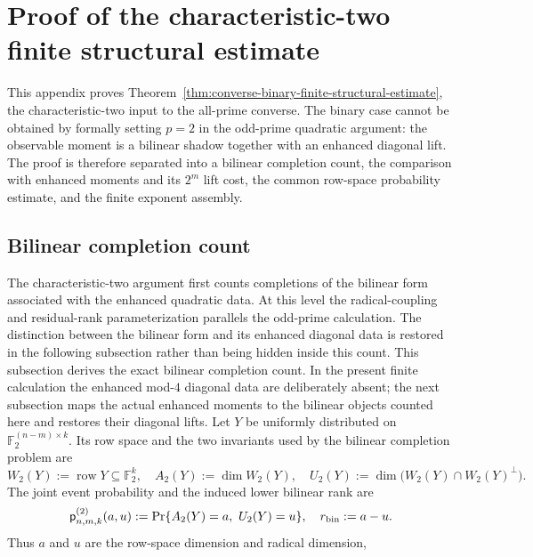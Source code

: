\documentclass[11pt]{article}
\newcommand{\F}{\mathbb F}
\newcommand{\1}{\mathbf 1}
\theoremstyle{plain}
\theoremstyle{definition}
\theoremstyle{remark}
\begin{document}
\section{Proof of the characteristic-two finite structural estimate}
\label{app:binary-finite-structural-proof}
This appendix proves Theorem~\ref{thm:converse-binary-finite-structural-estimate}, the characteristic-two input to the all-prime converse.  The binary case cannot be obtained by formally setting $p=2$ in the odd-prime quadratic argument: the observable moment is a bilinear shadow together with an enhanced diagonal lift.  The proof is therefore separated into a bilinear completion count, the comparison with enhanced moments and its $2^m$ lift cost, the common row-space probability estimate, and the finite exponent assembly.

\subsection{Bilinear completion count}
The characteristic-two argument first counts completions of the bilinear form associated with the enhanced quadratic data.  At this level the radical-coupling and residual-rank parameterization parallels the odd-prime calculation.  The distinction between the bilinear form and its enhanced diagonal data is restored in the following subsection rather than being hidden inside this count.
\label{subsubsec:binary-complete-finite-proof}
\label{sec:integrated-qubit-completion}
This subsection derives the exact bilinear completion count.  In the present finite calculation
the enhanced mod-$4$ diagonal data are deliberately absent; the next
subsection maps the actual enhanced moments to the bilinear objects counted
here and restores their diagonal lifts.  Let $Y$ be uniformly distributed on
$\F_2^{(n-m)\times k}$.  Its row space and the two invariants used by the
bilinear completion problem are
\begin{equation}
 W_2(Y):=\operatorname{row}Y\subseteq\F_2^k,
 \quad
 A_2(Y):=\dim W_2(Y),
 \quad
 U_2(Y):=\dim\bigl(W_2(Y)\cap W_2(Y)^\perp\bigr).
 \label{eq:integrated-qubit-au-lower-block-rank}
\end{equation}
The joint event probability and the induced lower bilinear rank are
\begin{equation}
 \mathsf p_{n,m,k}^{(2)}(a,u)
 :=\Pr\{A_2(Y)=a,\ U_2(Y)=u\},
 \quad r_{\rm bin}:=a-u.
 \label{eq:integrated-binary-unreported-mass-function}
\end{equation}
Thus $a$ and $u$ are the row-space dimension and radical dimension,
\end{document}
